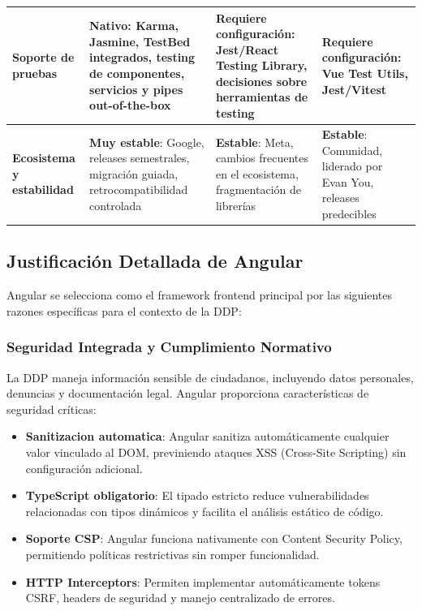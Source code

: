 \begin{table}[h]
\begin{tabular}{|p{2.5cm}|p{3.5cm}|p{3.5cm}|p{3.5cm}|}
\hline
\textbf{Soporte de pruebas} & \textbf{Nativo}: Karma, Jasmine, TestBed integrados, testing de componentes, servicios y pipes out-of-the-box & \textbf{Requiere configuración}: Jest/React Testing Library, decisiones sobre herramientas de testing & \textbf{Requiere configuración}: Vue Test Utils, Jest/Vitest \\
\hline
\textbf{Ecosistema y estabilidad} & \textbf{Muy estable}: Google, releases semestrales, migración guiada, retrocompatibilidad controlada & \textbf{Estable}: Meta, cambios frecuentes en el ecosistema, fragmentación de librerías & \textbf{Estable}: Comunidad, liderado por Evan You, releases predecibles \\
\hline
\end{tabular}
\end{table}

\subsection{Justificación Detallada de Angular}

Angular se selecciona como el framework frontend principal por las siguientes razones específicas para el contexto de la DDP:

\subsubsection{Seguridad Integrada y Cumplimiento Normativo}

La DDP maneja información sensible de ciudadanos, incluyendo datos personales, denuncias y documentación legal. Angular proporciona características de seguridad críticas:

\begin{itemize}
    \item \textbf{Sanitizacion automatica}: Angular sanitiza automáticamente cualquier valor vinculado al DOM, previniendo ataques XSS (Cross-Site Scripting) sin configuración adicional.
    \item \textbf{TypeScript obligatorio}: El tipado estricto reduce vulnerabilidades relacionadas con tipos dinámicos y facilita el análisis estático de código.
    \item \textbf{Soporte CSP}: Angular funciona nativamente con Content Security Policy, permitiendo políticas restrictivas sin romper funcionalidad.
    \item \textbf{HTTP Interceptors}: Permiten implementar automáticamente tokens CSRF, headers de seguridad y manejo centralizado de errores.
\end{itemize}

